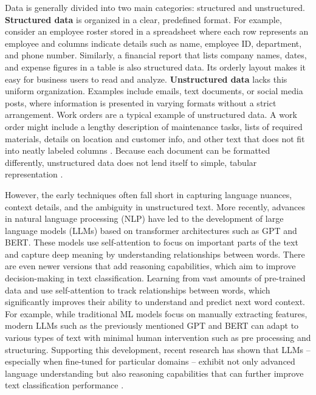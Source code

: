 Data is generally divided into two main categories: structured and unstructured. \textbf{Structured data} is organized in a clear, predefined format. For example, consider an employee roster stored in a spreadsheet where each row represents an employee and columns indicate details such as name, employee ID, department, and phone number. Similarly, a financial report that lists company names, dates, and expense figures in a table is also structured data. Its orderly layout makes it easy for business users to read and analyze. \textbf{Unstructured data} lacks this uniform organization. Examples include emails, text documents, or social media posts, where information is presented in varying formats without a strict arrangement. Work orders are a typical example of unstructured data. A work order might include a lengthy description of maintenance tasks, lists of required materials, details on location and customer info, and other text that does not fit into neatly labeled columns \cite{ibm2023work}. Because each document can be formatted differently, unstructured data does not lend itself to simple, tabular representation \cite{ibm2025datadiff}.

However, the early techniques often fall short in capturing language nuances, context details, and the ambiguity in unstructured text. More recently, advances in natural language processing (NLP) have led to the development of large language models (LLMs) based on transformer architectures such as GPT and BERT. These models use self-attention to focus on important parts of the text and capture deep meaning by understanding relationships between words. There are even newer versions that add reasoning capabilities, which aim to improve decision-making in text classification. Learning from vast amounts of pre-trained data and use self-attention to track relationships between words, which significantly improves their ability to understand and predict next word context. For example, while traditional ML models focus on manually extracting features, modern LLMs such as the previously mentioned GPT and BERT can adapt to various types of text with minimal human intervention such as pre processing and structuring. Supporting this development, recent research has shown that LLMs -- especially when fine-tuned for particular domains -- exhibit not only advanced language understanding but also reasoning capabilities that can further improve text classification performance \cite{huang2024classification, andersson2024ikea, merritt2022transformer, nazyrova2024medical, wang2024classifiers}.

